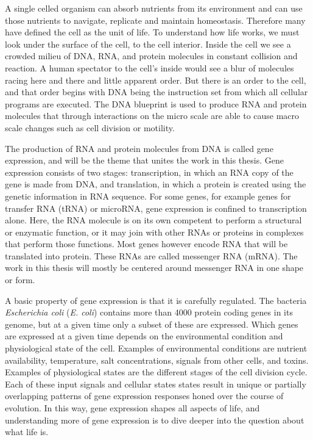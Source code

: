 %
A single celled organism can absorb nutrients from its environment and can use
those nutrients to navigate, replicate and maintain homeostasis. Therefore many
have defined the cell as the unit of life.  To understand how life works, we
must look under the surface of the cell, to the cell interior. Inside the cell
we see a crowded milieu of DNA, RNA, and protein molecules in constant
collision and reaction. A human spectator to the cell's inside would see a blur
of molecules racing here and there and little apparent order. But there is an
order to the cell, and that order begins with DNA being the instruction set
from which all cellular programs are executed. The DNA blueprint is used to
produce RNA and protein molecules that through interactions on the micro scale
are able to cause macro scale changes such as cell division or motility.

The production of RNA and protein molecules from DNA is called gene expression,
and will be the theme that unites the work in this thesis. Gene expression
consists of two stages: transcription, in which an RNA copy of the gene is made
from DNA, and translation, in which a protein is created using the genetic
information in RNA sequence. For some genes, for example genes for transfer RNA
(tRNA) or microRNA, gene expression is confined to transcription alone. Here,
the RNA molecule is on its own competent to perform a structural or enzymatic
function, or it may join with other RNAs or proteins in complexes that perform
those functions. Most genes however encode RNA that will be translated into
protein. These RNAs are called messenger RNA (mRNA). The work in this thesis
will mostly be centered around messenger RNA in one shape or form.

A basic property of gene expression is that it is carefully regulated. The
bacteria \textit{Escherichia coli} (\textit{E. coli}) contains more than 4000
protein coding genes in its genome, but at a given time only a subset of these
are expressed. Which genes are expressed at a given time depends on the
environmental condition and physiological state of the cell. Examples of
environmental conditions are nutrient availability, temperature, salt
concentrations, signals from other cells, and toxins. Examples of physiological
states are the different stages of the cell division cycle. Each of these input
signals and cellular states states result in unique or partially overlapping
patterns of gene expression responses honed over the course of evolution. In
this way, gene expression shapes all aspects of life, and understanding more of
gene expression is to dive deeper into the question about what life is.

